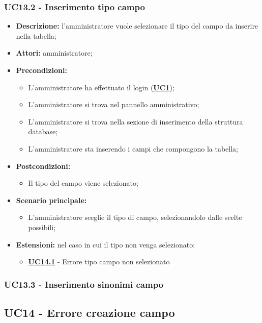 \documentclass[5pt]{article}
\begin{document}
\subsubsection{UC13.2 - Inserimento tipo campo}
\label{sec:UC13.2}
\begin{itemize}
	\item \textbf{Descrizione:} l’amministratore vuole selezionare il tipo del campo da inserire nella tabella;
	\item \textbf{Attori:} amministratore;
	\item \textbf{Precondizioni:} 
	\begin{itemize}
		\item L’amministratore ha effettuato il login (\hyperref[sec:UC1]{\textbf{UC1}});
		\item L’amministratore si trova nel pannello amministrativo;
		\item L’amministratore si trova nella sezione di inserimento della struttura database;
		\item L’amministratore sta inserendo i campi che compongono la tabella;
	\end{itemize}
	\item \textbf{Postcondizioni:} 
	\begin{itemize}
		\item Il tipo del campo viene selezionato;
	\end{itemize}
	\item \textbf{Scenario principale:} 
	\begin{itemize}
		\item L’amministratore sceglie il tipo di campo, selezionandolo dalle scelte possibili;
	\end{itemize}
	\item \textbf{Estensioni:} nel caso in cui il tipo non venga selezionato:
	\begin{itemize}
		\item \hyperref[sec:UC14.1]{\textbf{UC14.1}} - Errore tipo campo non selezionato
	\end{itemize}
\end{itemize}

\subsubsection{UC13.3 - Inserimento sinonimi campo}
\label{sec:UC13.3}

\subsection{UC14 - Errore creazione campo}
\label{sec:UC14}
\end{document}
